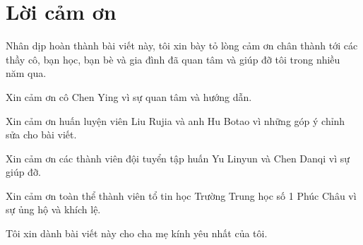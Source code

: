 \documentclass[11pt]{article}
\begin{document}
\section*{Lời cảm ơn}

Nhân dịp hoàn thành bài viết này, tôi xin bày tỏ lòng cảm ơn chân thành tới
các thầy cô, bạn học, bạn bè và gia đình đã quan tâm và giúp đỡ tôi trong
nhiều năm qua.

Xin cảm ơn cô Chen Ying vì sự quan tâm và hướng dẫn.

Xin cảm ơn huấn luyện viên Liu Rujia và anh Hu Botao vì những góp ý chỉnh sửa
cho bài viết.

Xin cảm ơn các thành viên đội tuyển tập huấn Yu Linyun và Chen Danqi vì sự
giúp đỡ.

Xin cảm ơn toàn thể thành viên tổ tin học Trường Trung học số 1 Phúc Châu vì
sự ủng hộ và khích lệ.

Tôi xin dành bài viết này cho cha mẹ kính yêu nhất của tôi.
\end{document}
